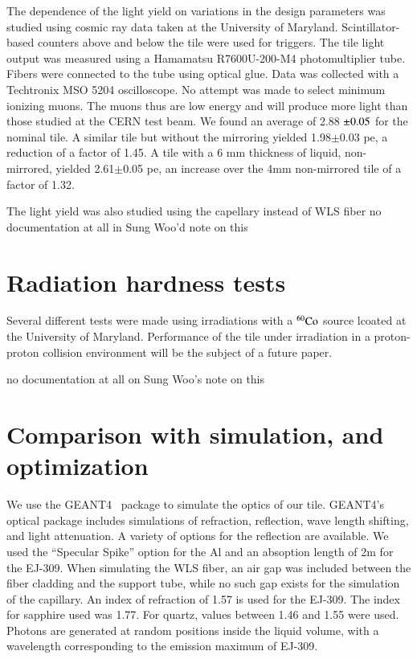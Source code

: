 \documentclass[review]{elsarticle}
\begin{document}
The dependence of the light yield on variations in the design
parameters was studied using cosmic ray data taken at the University
of Maryland.  Scintillator-based counters above and below the tile
were used for triggers.  The tile light output was measured using a
Hamamatsu R7600U-200-M4 photomultiplier tube.  Fibers were connected
to the tube using optical glue.  Data was collected with a Techtronix
MSO 5204 oscilloscope.  No attempt was made to select minimum ionizing
muons.  The muons thus are low energy and will produce more light than
those studied at the CERN test beam.  We found an average of 2.88
${\rm \pm } 0.05$ for the nominal tile.  A similar tile but without
the mirroring yielded 1.98${\pm} 0.03$ pe, a reduction of a factor of
1.45.  A tile with a 6 mm thickness of liquid, non-mirrored, yielded
2.61${\pm }$0.05 pe, an increase over the 4mm non-mirrored tile of a
factor of 1.32.

The light yield was also studied using the capellary instead of WLS
fiber {\color{red} no documentation at all in Sung Woo'd note on this}

\section{Radiation hardness tests}

Several different tests were made using irradiations with a
$\rm{^{60}Co}$ source lcoated at the University of Maryland.
Performance of the tile under irradiation in a proton-proton collision
environment will be the subject of a future paper.


{\color{red} no documentation at all on Sung Woo's note on this}

\section{Comparison with simulation, and optimization}
We use the GEANT4~\cite{Agostinelli2003250} package to simulate the
optics of our tile.  GEANT4's optical package includes simulations of
refraction, reflection, wave length shifting, and light attenuation.
A variety of options for the reflection are available.  We used the
``Specular Spike'' option for the Al and an absoption length of 2m for
the EJ-309.  When simulating the WLS fiber, an air gap was included
between the fiber cladding and the support tube, while no such gap
exists for the simulation of the capillary. An index of refraction of
1.57 is used for the EJ-309.  The index for sapphire used was 1.77.
For quartz, values between 1.46 and 1.55 were used.  Photons are
generated at random positions inside the liquid volume, with a
wavelength corresponding to the emission maximum of EJ-309.
\end{document}
